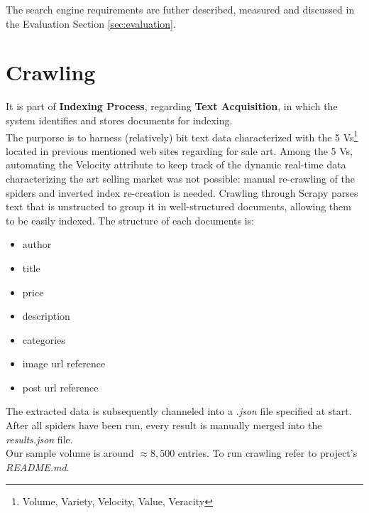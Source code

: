 \documentclass[12pt]{spieman}  %
\begin{document}
\begin{spacing}{1}
    The search engine requirements are futher described, measured and discussed
    in the Evaluation Section \ref{sec:evaluation}.

    \section{Crawling}\label{sec:crawling}
    It is part of \textbf{Indexing Process}, regarding \textbf{Text Acquisition}, in which the system
    identifies and stores documents for indexing.\\
    The purporse is to harness (relatively) bit text data characterized with the 5
    Vs\footnote{Volume, Variety, Velocity, Value, Veracity}
    located in previous mentioned web sites regarding for sale art.
    Among the 5 Vs, automating the Velocity attribute to keep track of the dynamic real-time data characterizing
    the art selling market was not possible:
    manual re-crawling of the spiders and inverted index re-creation is needed.
    Crawling through Scrapy parses text that is unstructed to group it in well-structured documents,
    allowing them to be easily indexed.
    The structure of each documents is:
    \vspace{-0.1cm}
    \begin{itemize}
        \setlength\itemsep{0.1em}
        \item author
        \item title
        \item price
        \item description
        \item categories
        \item image url reference
        \item post url reference
    \end{itemize}

    The extracted data is subsequently channeled into a \textit{.json} file specified at start.
    After all spiders have been run, every result is manually merged into the \textit{results.json} file.\\
    Our sample volume is around $\approx 8,500$ entries.
    To run crawling refer to project's \textit{README.md}.


\end{spacing}
\end{document}
